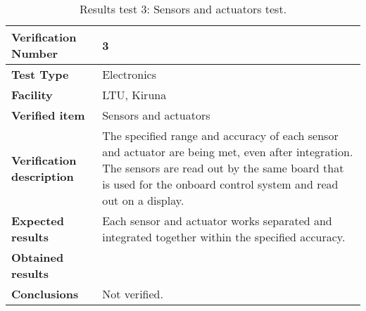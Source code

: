 \begin{table}[H]
\centering

\begin{tabular}{|m{}| m{} |}
\hline
\textbf{Verification Number} 		& 3 					\\ \hline
\textbf{Test Type} 					& Electronics 			\\ \hline
\textbf{Facility} 					& LTU, Kiruna 			\\ \hline
\textbf{Verified item} 				& Sensors and actuators	\\ \hline

\textbf{Verification description} 	& The specified range and accuracy of each sensor and actuator are being met, even after integration. The sensors are read out by the same board that is used for the onboard control system and read out on a display. \\ \hline

\textbf{Expected results} 			& Each sensor and actuator works separated and integrated together within the specified accuracy. \\ \hline

\textbf{Obtained results} 			& \\ \hline

\textbf{Conclusions} 				& Not verified.		\\ \hline
\end{tabular}
\caption{Results test 3: Sensors and actuators test.}
\label{tab:testresult3:electronics}
\end{table}


\raggedbottom